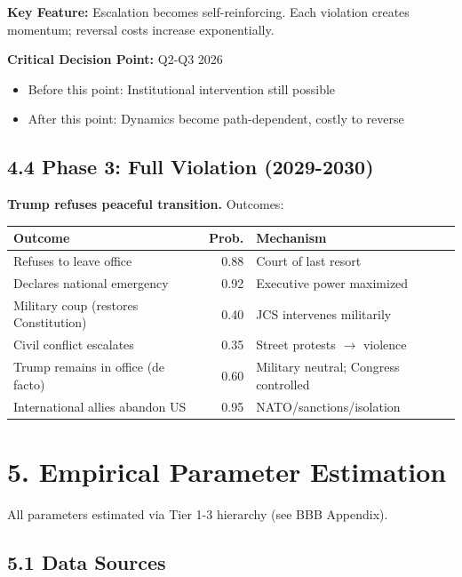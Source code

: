 \documentclass[11pt]{article}
\begin{document}
\textbf{Key Feature:} Escalation becomes self-reinforcing. Each violation creates momentum; reversal costs increase exponentially.

\textbf{Critical Decision Point:} Q2-Q3 2026
\begin{itemize}
\item Before this point: Institutional intervention still possible
\item After this point: Dynamics become path-dependent, costly to reverse
\end{itemize}

\subsection{4.4 Phase 3: Full Violation (2029-2030)}

\textbf{Trump refuses peaceful transition.} Outcomes:

\begin{table}[h]
\centering
\begin{tabular}{|l|r|l|}
\hline
\textbf{Outcome} & \textbf{Prob.} & \textbf{Mechanism} \\
\hline
Refuses to leave office & 0.88 & Court of last resort \\
Declares national emergency & 0.92 & Executive power maximized \\
Military coup (restores Constitution) & 0.40 & JCS intervenes militarily \\
Civil conflict escalates & 0.35 & Street protests $\to$ violence \\
Trump remains in office (de facto) & 0.60 & Military neutral; Congress controlled \\
International allies abandon US & 0.95 & NATO/sanctions/isolation \\
\hline
\end{tabular}
\end{table}

\section{5. Empirical Parameter Estimation}

All parameters estimated via Tier 1-3 hierarchy (see BBB Appendix).

\subsection{5.1 Data Sources}
\end{document}
